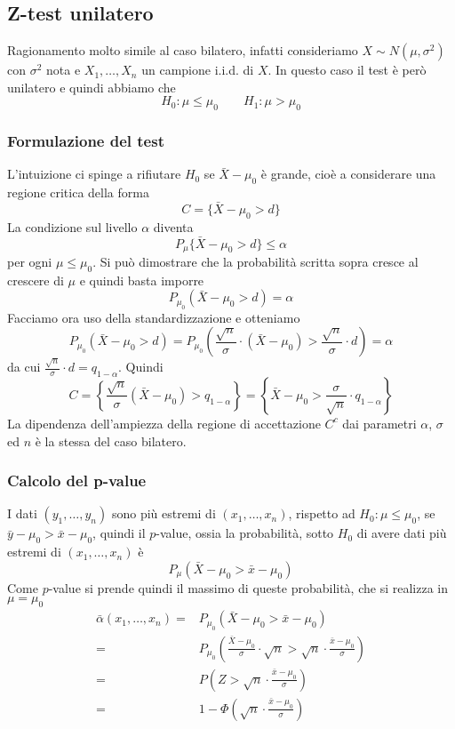 \subsection{Z-test unilatero}
Ragionamento molto simile al caso bilatero, infatti consideriamo $X \sim N(\mu, \sigma^2)$ con
$\sigma^2$ nota e $X_1, \dots, X_n$ un campione i.i.d. di $X$. In questo caso il test è però
unilatero e quindi abbiamo che
\[ H_0: \mu \leq \mu_0 \qquad H_1: \mu > \mu_0 \]

\subsubsection{Formulazione del test}
L'intuizione ci spinge a rifiutare $H_0$ se $\bar{X} - \mu_0$ è grande, cioè a considerare
una regione critica della forma
\[ C = \{ \bar{X} - \mu_0 > d \} \]
La condizione sul livello $\alpha$ diventa
\[ P_\mu \{ \bar{X} - \mu_0 > d \} \leq \alpha \]
per ogni $\mu \leq \mu_0$. Si può dimostrare che la probabilità scritta sopra cresce al crescere
di $\mu$ e quindi basta imporre
\[ P_{\mu_0} (\bar{X} - \mu_0 > d) = \alpha \]
Facciamo ora uso della standardizzazione e otteniamo
\[
	P_{\mu_0} (\bar{X} - \mu_0 > d) =
	P_{\mu_0} \left( \frac{\sqrt{n}}{\sigma} \cdot (\bar{X} - \mu_0) >
	\frac{\sqrt{n}}{\sigma} \cdot d \right) = \alpha
\]
da cui $\frac{\sqrt{n}}{\sigma} \cdot d = q_{1-\alpha}$. Quindi
\[
	C = \left\{ \frac{\sqrt{n}}{\sigma} (\bar{X} - \mu_0) > q_{1-\alpha} \right\}
	= \left\{ \bar{X} - \mu_0 > \frac{\sigma}{\sqrt{n}} \cdot q_{1-\alpha} \right\}
\]
La dipendenza dell'ampiezza della regione di accettazione $C^c$ dai parametri $\alpha$, $\sigma$
ed $n$ è la stessa del caso bilatero.

\subsubsection{Calcolo del p-value}
I dati $(y_1, \dots, y_n)$ sono più estremi di $(x_1, \dots, x_n)$, rispetto ad
$H_0: \mu \leq \mu_0$, se $\bar{y} - \mu_0 > \bar{x} - \mu_0$, quindi il $p$-value, ossia la
probabilità, sotto $H_0$ di avere dati più estremi di $(x_1, \dots, x_n)$ è
\[ P_\mu \left( \bar{X} - \mu_0 > \bar{x} - \mu_0 \right) \]
Come $p$-value si prende quindi il massimo di queste probabilità, che si realizza in $\mu = \mu_0$
\begin{align*}
	\bar{\alpha} (x_1, \dots, x_n)
	= & P_{\mu_0} \left( \bar{X} - \mu_0 > \bar{x} - \mu_0 \right)            \\
	= & P_{\mu_0} \left( \frac{\bar{X} - \mu_0}{\sigma} \cdot \sqrt{n} >
	\sqrt{n} \cdot \frac{\bar{x} - \mu_0}{\sigma} \right)                     \\
	= & P \left( Z > \sqrt{n} \cdot \frac{\bar{x} - \mu_0}{\sigma} \right)    \\
	= & 1 - \Phi \left( \sqrt{n} \cdot \frac{\bar{x} - \mu_0}{\sigma} \right)
\end{align*}

